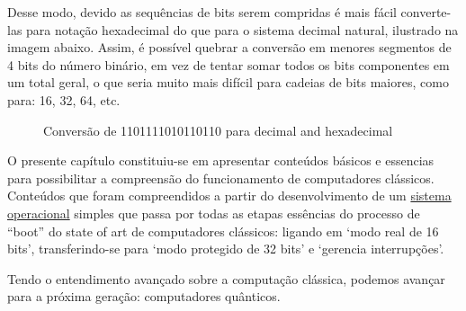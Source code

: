 Desse modo, devido as sequências de bits serem compridas é mais fácil converte-las para notação hexadecimal do que para o sistema decimal natural, ilustrado na imagem abaixo. Assim, é possível quebrar a conversão em menores segmentos de 4 bits do número binário, em vez de tentar somar todos os bits componentes em um total geral, o que seria muito mais difícil para cadeias de bits maiores, como para: 16, 32, 64, etc. 

\vspace{1cm}
\begin{figure}[H] \centering 
  \caption{\label{fig:2} Conversão de 1101111010110110 para decimal and hexadecimal} 
\end{figure}

O presente capítulo constituiu-se em apresentar conteúdos básicos e essencias para possibilitar a compreensão do funcionamento de computadores clássicos. Conteúdos que foram compreendidos a partir do desenvolvimento de um \href{https://github.com/gzsig/zsig-OS}{sistema operacional} simples que passa por todas as etapas essências do processo de ``boot'' do state of art de computadores clássicos: ligando em `modo real de 16 bits', transferindo-se para `modo protegido de 32 bits' e `gerencia interrupções'.

Tendo o entendimento avançado sobre a computação clássica, podemos avançar para a próxima geração: computadores quânticos.
\newpage
